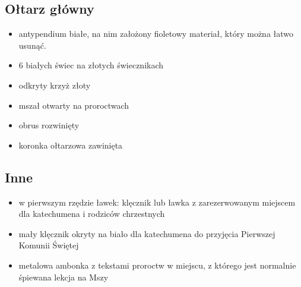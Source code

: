 \subsection{Ołtarz główny}
\begin{itemize}
	\item antypendium białe, na nim założony {\color{violet}fioletowy} materiał,
	      który można łatwo usunąć.
	\item 6 białych świec na złotych świecznikach
	\item odkryty krzyż złoty
	\item mszał otwarty na proroctwach
	\item obrus rozwinięty
	\item koronka ołtarzowa zawinięta
\end{itemize}

\subsection{Inne}
\begin{itemize}
	\item w pierwszym rzędzie ławek: klęcznik lub ławka z zarezerwowanym
	      miejscem dla katechumena i rodziców chrzestnych
	\item mały klęcznik okryty na biało dla katechumena do przyjęcia Pierwszej
		  Komunii Świętej
	\item metalowa ambonka z tekstami proroctw w miejscu, z którego jest
	      normalnie śpiewana lekcja na Mszy
\end{itemize}

\hrulefill

